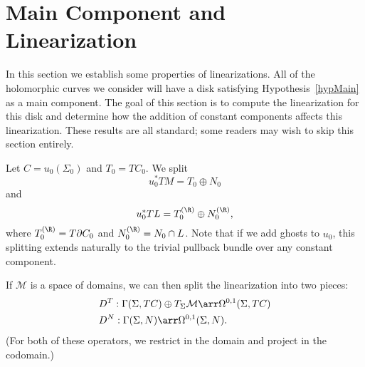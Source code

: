 \section{Main Component and Linearization} \label{mainS}

In this section we establish some properties of linearizations. All of the holomorphic curves we consider will have a disk satisfying Hypothesis~\ref{hypMain} as a main component. The goal of this section is to compute the linearization for this disk and determine how the addition of constant components affects this linearization. These results are all standard; some readers may wish to skip this section entirely.

Let $C=u_0(\Sigma_0)$ and $T_0=TC_0$. We split 
\[
u_0^*TM = T_0 \oplus N_0
\]
and
\[
u_0^*TL = T_0^{(\R)} \oplus N_0^{(\R)},
\]
where $T_0^{(\R)}=T\partial C_0$ and $N_0^{(\R)}=N_0 \cap L$. Note that if we add ghosts to $u_0$, this splitting extends naturally to the trivial pullback bundle over any constant component. 

If $\mathcal{M}$ is a space of domains, we can then split the linearization into two pieces:
\begin{align*}
& D^T: \Gamma(\Sigma,TC) \oplus T_\Sigma\mathcal{M} \arr \Omega^{0,1}(\Sigma,TC)
\\
& D^N: \Gamma(\Sigma,N) \arr \Omega^{0,1}(\Sigma,N).
\end{align*}
(For both of these operators, we restrict in the domain and project in the codomain.)

